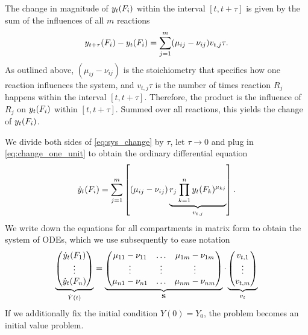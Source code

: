 The change in magnitude of $y_t(F_i)$ within the interval $[t, t+\tau]$ is given by the sum of the influences of all $m$ reactions
\begin{align}
\label{eq:sys_change}
y_{t+\tau}(F_i) - y_t(F_i) = \sum_{j=1}^m (\mu_{ij} - \nu_{ij}) v_{t,j} \tau.
\end{align}
As outlined above, $(\mu_{ij} - \nu_{ij})$ is the stoichiometry that specifies how one reaction influences the system, and $v_{t,j} \tau$ is the number of times reaction $R_j$ happens within the interval $[t, t+\tau]$. Therefore, the product is the influence of $R_j$ on $y_t(F_i)$ within $[t, t+\tau]$. Summed over all reactions, this yields the change of $y_t(F_i)$. 

We divide both sides of \eqref{eq:sys_change} by $\tau$, let $\tau \to 0$ and plug in \eqref{eq:change_one_unit} to obtain the ordinary differential equation
\begin{align}
\dot{y}_t(F_i) = \sum_{j=1}^m \left[(\mu_{ij} - \nu_{ij}) \underbrace{r_j  \prod_{k=1}^n y_t(F_k)^{\mu_{kj}}}_{v_{t,j}} \right].
\end{align}
We write down the equations for all compartments in matrix form to obtain the system of ODEs, which we use subsequently to ease notation
\begin{align}
\label{eq:ode_system_matrix}
\underbrace{\begin{pmatrix}
\dot{y}_t(F_1) \\ \vdots \\ \dot{y}_t(F_n) \end{pmatrix}}_{\dot{Y}(t)} =
\underbrace{\begin{pmatrix}
\mu_{11} - \nu_{11} & \hdots & \mu_{1m} - \nu_{1m} \\
\vdots & \vdots & \vdots \\
\mu_{n1} - \nu_{n1} & \hdots & \mu_{nm} - \nu_{nm} \\
\end{pmatrix}}_{\mathbf{S}} \cdot
\underbrace{\begin{pmatrix}
v_{t,1} \\ \vdots \\ v_{t,m}
\end{pmatrix}}_{v_t}
\end{align}
If we additionally fix the initial condition $Y(0) = Y_0$, the problem becomes an initial value problem. 
